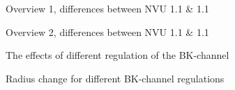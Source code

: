 \begin{landscape}
	
	\begin{figure}[h!]
		\centering
		\tiny 
		\setlength\figureheight{2 cm} 
		\setlength\figurewidth{18 cm}
		
		\caption{Overview 1, differences between NVU 1.1  \& 1.1}
		\label{fig:NVU10a}
	\end{figure}
	
	\begin{figure}[h!]
		\centering
		\tiny 
		\setlength\figureheight{2.5 cm} 
		\setlength\figurewidth{9 cm}
		
		\caption{Overview 2, differences between NVU 1.1  \& 1.1}
		\label{fig:NVU10b}
	\end{figure}
		\begin{figure}[h!]
			\centering
			\tiny  
			\setlength\figureheight{2.5 cm} 
			\setlength\figurewidth{9 cm}
			
			\caption{The effects of different regulation of the BK-channel}
			\label{fig:BKeff}
		\end{figure}
		
		\begin{figure}[h!]
			\centering
			\tiny 
			\setlength\figureheight{7.5 cm} 
			\setlength\figurewidth{18 cm}
			
			\caption{Radius change for different BK-channel regulations}
			\label{fig:SMCfluxes}
		\end{figure}
\end{landscape}

%
